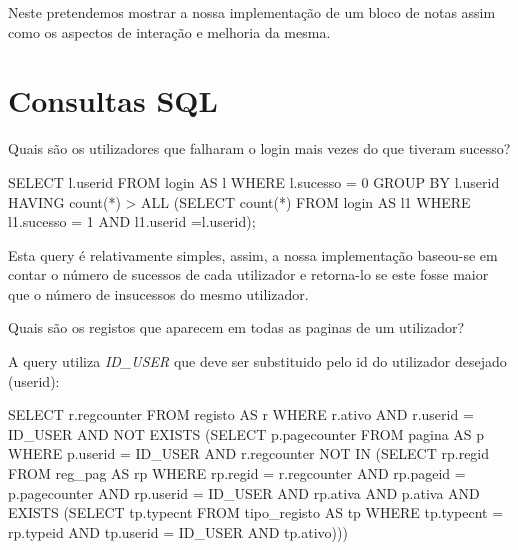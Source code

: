 \documentclass[11pt,a4paper]{article}
\begin{document}
Neste pretendemos mostrar a nossa implementação de um bloco de notas assim como os aspectos de interação e melhoria da mesma.


\newpage

\section{Consultas SQL}
\begin{enumerate}[label=(\alph*)]
\begin{minipage}{\textwidth}
	\item Quais são os utilizadores que falharam o login mais vezes do que tiveram sucesso?
	
		\begin{code}[language=SQL]
SELECT l.userid
FROM login AS l
WHERE l.sucesso = 0
GROUP BY l.userid
HAVING count(*) > ALL
    (SELECT count(*)
     FROM login AS l1
     WHERE l1.sucesso = 1
         AND l1.userid =l.userid);
		\end{code}
		
Esta query é relativamente simples, assim, a nossa implementação baseou-se em contar o número de sucessos de cada utilizador e retorna-lo se este fosse maior que o número de insucessos do mesmo utilizador.
\end{minipage}

\begin{minipage}{\textwidth}
	\item Quais são os registos que aparecem em todas as paginas de um utilizador?
	
	A query utiliza \textit{ID\_USER} que deve ser substituido pelo id do utilizador desejado (userid):
		\begin{code}[language=SQL]
SELECT r.regcounter
FROM registo AS r
WHERE r.ativo
    AND r.userid = ID_USER
    AND NOT EXISTS
        (SELECT p.pagecounter
         FROM pagina AS p
         WHERE p.userid = ID_USER
             AND r.regcounter NOT IN
                 (SELECT rp.regid
                  FROM reg_pag AS rp
                  WHERE rp.regid = r.regcounter
                      AND rp.pageid = p.pagecounter
                      AND rp.userid = ID_USER
                      AND rp.ativa
                      AND p.ativa
                      AND EXISTS
                          (SELECT tp.typecnt
                           FROM tipo_registo AS tp
                           WHERE tp.typecnt = rp.typeid
                               AND tp.userid = ID_USER
                               AND tp.ativo)))
        		\end{code}
        		

\end{minipage}
\end{enumerate}
\end{document}
